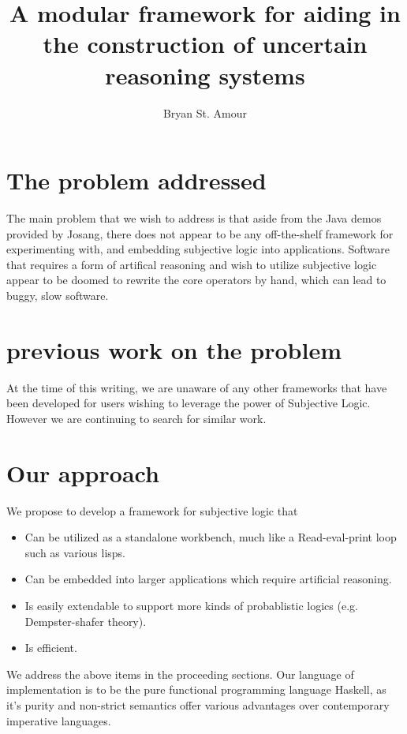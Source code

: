 \documentclass[a4paper]{article}
\title{A modular framework for aiding in the construction of uncertain reasoning systems}
\author{Bryan St. Amour}
\begin{document}
\maketitle

\section{The problem addressed}

\par
The main problem that we wish to address is that aside from the Java demos provided
by Josang, there does not appear to be any off-the-shelf framework for experimenting
with, and embedding subjective logic into applications. Software that requires a form
of artifical reasoning and wish to utilize subjective logic appear to be doomed to
rewrite the core operators by hand, which can lead to buggy, slow software.

\section{previous work on the problem}

\par
At the time of this writing, we are unaware of any other frameworks that have been
developed for users wishing to leverage the power of Subjective Logic. However we
are continuing to search for similar work.

\section{Our approach}

\par
We propose to develop a framework for subjective logic that

\begin{itemize}
	\item Can be utilized as a standalone workbench, much like a Read-eval-print loop such as various lisps.
	\item Can be embedded into larger applications which require artificial reasoning.
	\item Is easily extendable to support more kinds of probablistic logics (e.g. Dempster-shafer theory).
	\item Is efficient.
\end{itemize}

\par
We address the above items in the proceeding sections.
Our language of implementation is to be the pure functional programming language Haskell, as it's purity
and non-strict semantics offer various advantages over contemporary imperative languages.
\end{document}
